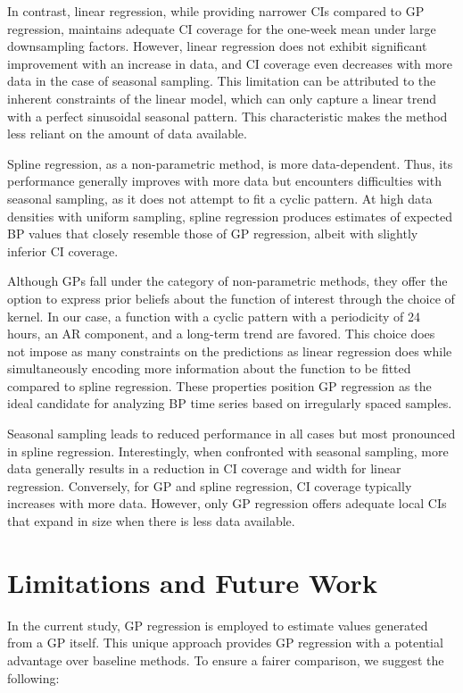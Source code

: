 In contrast, linear regression, while providing narrower CIs compared to GP regression,
maintains adequate CI coverage for the one-week mean under large downsampling factors.
However, linear regression does not exhibit significant improvement with an increase in data,
and CI coverage even decreases with more data in the case of seasonal sampling.
This limitation can be attributed to the inherent constraints of the linear model,
which can only capture a linear trend with a perfect sinusoidal seasonal pattern.
This characteristic makes the method less reliant on the amount of data available.

Spline regression, as a non-parametric method, is more data-dependent.
Thus, its performance generally improves with more data but encounters
difficulties with seasonal sampling, as it does not attempt to fit a cyclic pattern.
At high data densities with uniform sampling, spline regression produces estimates
of expected BP values that closely resemble those of GP regression,
albeit with slightly inferior CI coverage.

Although GPs fall under the category of non-parametric methods, they offer the option to express
prior beliefs about the function of interest through the choice of kernel.
In our case, a function with a cyclic pattern with a periodicity of 24 hours,
an AR component, and a long-term trend are favored.
This choice does not impose as many constraints on the predictions as linear regression does
while simultaneously encoding more information about the function
to be fitted compared to spline regression.
These properties position GP regression as the ideal candidate for analyzing
BP time series based on irregularly spaced samples.


Seasonal sampling leads to reduced performance in all
cases but most pronounced in spline regression.
Interestingly, when confronted with seasonal sampling, more data generally
results in a reduction in CI coverage and width for linear regression.
Conversely, for GP and spline regression, CI coverage typically increases
with more data.
However, only GP regression offers adequate local CIs that expand in size
when there is less data available.

\section{Limitations and Future Work}

In the current study, GP regression is employed to estimate values generated from a GP itself.
This unique approach provides GP regression with a potential advantage over baseline methods.
To ensure a fairer comparison, we suggest the following:

